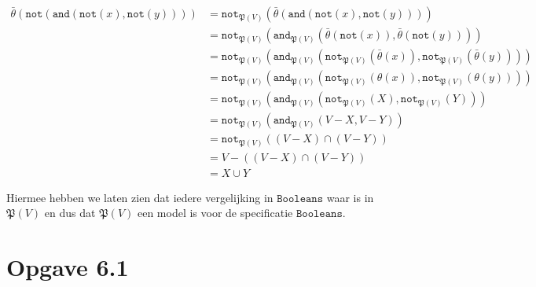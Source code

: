 \documentclass[a4paper,11pt]{article}
\begin{document}
\begin{itemize}
\begin{align*}
\bar \theta(\texttt{not}(\texttt{and}(\texttt{not}(x), \texttt{not}(y))))
      &= \texttt{not}_{\mathfrak{P}(V)}(\bar \theta(\texttt{and}(\texttt{not}(x), \texttt{not}(y)))) \\
      &= \texttt{not}_{\mathfrak{P}(V)}(\texttt{and}_{\mathfrak{P}(V)}(\bar \theta(\texttt{not}(x)), \bar \theta(\texttt{not}(y)))) \\
      &= \texttt{not}_{\mathfrak{P}(V)}(\texttt{and}_{\mathfrak{P}(V)}(\texttt{not}_{\mathfrak{P}(V)}(\bar \theta(x)), \texttt{not}_{\mathfrak{P}(V)}(\bar \theta(y)))) \\
      &= \texttt{not}_{\mathfrak{P}(V)}(\texttt{and}_{\mathfrak{P}(V)}(\texttt{not}_{\mathfrak{P}(V)}(\theta(x)), \texttt{not}_{\mathfrak{P}(V)}(\theta(y)))) \\
      &= \texttt{not}_{\mathfrak{P}(V)}(\texttt{and}_{\mathfrak{P}(V)}(\texttt{not}_{\mathfrak{P}(V)}(X), \texttt{not}_{\mathfrak{P}(V)}(Y))) \\
      &= \texttt{not}_{\mathfrak{P}(V)}(\texttt{and}_{\mathfrak{P}(V)}(V - X, V - Y)) \\
      &= \texttt{not}_{\mathfrak{P}(V)}((V - X) \cap (V - Y)) \\
      &= V - ((V - X) \cap (V - Y)) \\
      &= X \cup Y
\end{align*}

\end{itemize}

Hiermee hebben we laten zien dat iedere vergelijking in $\texttt{Booleans}$
waar is in $\mathfrak{P}(V)$ en dus dat $\mathfrak{P}(V)$ een model is voor de
specificatie $\texttt{Booleans}$.


\section*{Opgave 6.1}
\end{document}
